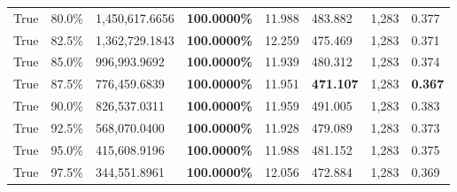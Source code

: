 \begin{table}[H]
\begin{tabular}{lllrllll}
\cline{1-8}
True & 80.0\% & 1,450,617.6656 & \bfseries \color{red} 100.0000\% & 11.988 & 483.882 & 1,283 & 0.377 \\
\cline{1-8}
True & 82.5\% & 1,362,729.1843 & \bfseries \color{red} 100.0000\% & 12.259 & 475.469 & 1,283 & 0.371 \\
\cline{1-8}
True & 85.0\% & 996,993.9692 & \bfseries \color{red} 100.0000\% & 11.939 & 480.312 & 1,283 & 0.374 \\
\cline{1-8}
True & 87.5\% & 776,459.6839 & \bfseries \color{red} 100.0000\% & 11.951 & \bfseries \color{red} 471.107 & 1,283 & \bfseries \color{red} 0.367 \\
\cline{1-8}
True & 90.0\% & 826,537.0311 & \bfseries \color{red} 100.0000\% & 11.959 & 491.005 & 1,283 & 0.383 \\
\cline{1-8}
True & 92.5\% & 568,070.0400 & \bfseries \color{red} 100.0000\% & 11.928 & 479.089 & 1,283 & 0.373 \\
\cline{1-8}
True & 95.0\% & 415,608.9196 & \bfseries \color{red} 100.0000\% & 11.988 & 481.152 & 1,283 & 0.375 \\
\cline{1-8}
True & 97.5\% & 344,551.8961 & \bfseries \color{red} 100.0000\% & 12.056 & 472.884 & 1,283 & 0.369 \\
\cline{1-8}
\bottomrule
\end{tabular}
\end{table}

